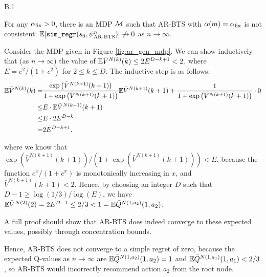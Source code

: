     \begin{customprop}{B.1}

        For any $\alpha_{\textnormal{fix}}>0$, there is an MDP $\mathcal{M}$ such that AR-BTS with $\alpha(m)=\alpha_{\textnormal{fix}}$ is not consistent: $\mathbb{E}[{\textnormal{\texttt{sim\_regr}}}(s_0,\psi^n_{\textnormal{AR-BTS}})] \not\to 0$ as $n\to\infty$. 
    \end{customprop}
    \begin{proofoutline}

        Consider the MDP given in Figure \ref{fig:ar_gen_mdp}. We can show inductively that (as $n\rightarrow\infty$) the value of $\mathbb{E}\bar{V}^{N(k)}(k)\leq 2E^{D-k+1} < 2$, where $E=e^2/(1+e^2)$ for $2\leq k \leq D$. The inductive step is as follows:
        \begin{align}
            \mathbb{E}\bar{V}^{N(k)}(k) =& \frac{\exp\left(\bar{V}^{N(k+1)}(k+1)\right)}{1+\exp\left(\bar{V}^{N(k+1)}(k+1)\right)} \mathbb{E}\bar{V}^{N(k+1)}(k+1) 
                + \frac{1}{1+\exp\left(\bar{V}^{N(k+1)}(k+1)\right)} \cdot 0 \\
                \leq& E \cdot \mathbb{E} \bar{V}^{N(k+1)}(k+1) \\
                \leq& E \cdot 2E^{D-k} \\
                =& 2E^{D-k+1}.
        \end{align}

        where we know that $\exp\left(\bar{V}^{N(k+1)}(k+1)\right)/\left(1+\exp\left(\bar{V}^{N(k+1)}(k+1)\right)\right) < E$, because the function $e^x/(1+e^x)$ is monotonically increasing in $x$, and $\bar{V}^{N(k+1)}(k+1) < 2$. Hence, by choosing an integer $D$ such that $D-1 \geq \log(1/3) / \log(E)$, we have $\mathbb{E}\bar{V}^{N(2)}(2)=2E^{D-1}\leq 2/3 < 1 = \mathbb{E}\bar{Q}^{N(1,a_2)}(1,a_2)$. 

        A full proof should show that AR-BTS does indeed converge to these expected values, possibly through concentration bounds. 

        Hence, AR-BTS does not converge to a simple regret of zero, because the expected Q-values as $n\rightarrow\infty$ are $\mathbb{E}\bar{Q}^{N(1,a_2)}(1,a_2)=1$ and $\mathbb{E}\bar{Q}^{N(1,a_1)}(1,a_1)<2/3$, so AR-BTS would incorrectly recommend action $a_2$ from the root node. 
    \end{proofoutline}




